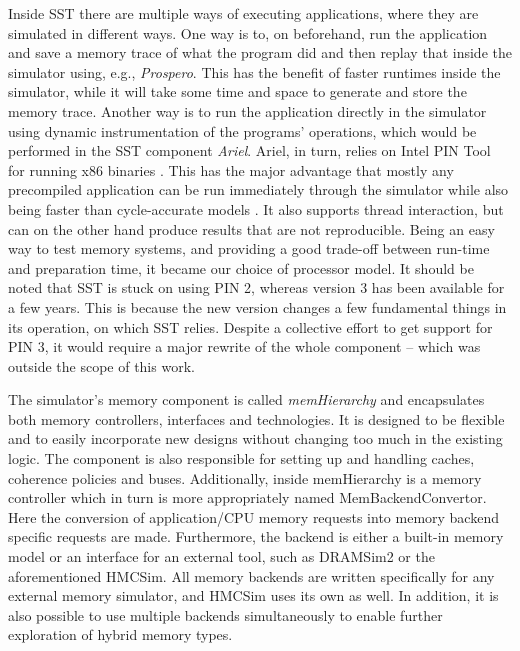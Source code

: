 Inside SST there are multiple ways of executing applications, where they are simulated in different ways. One way is to, on beforehand, run the application and save a memory trace of what the program did and then replay that inside the simulator using, e.g., \emph{Prospero}. This has the benefit of faster runtimes inside the simulator, while it will take some time and space to generate and store the memory trace. Another way is to run the application directly in the simulator using dynamic instrumentation of the programs' operations, which would be performed in the SST component \emph{Ariel}. Ariel, in turn, relies on Intel PIN Tool for running x86 binaries \cite{Luk:2005:PBC:1065010.1065034}. This has the major advantage that mostly any precompiled application can be run immediately through the simulator while also being faster than cycle-accurate models \cite{hammond2018structural}. It also supports thread interaction, but can on the other hand produce results that are not reproducible. Being an easy way to test memory systems, and providing a good trade-off between run-time and preparation time, it became our choice of processor model. It should be noted that SST is stuck on using PIN 2, whereas version 3 has been available for a few years. This is because the new version changes a few fundamental things in its operation, on which SST relies. Despite a collective effort to get support for PIN 3, it would require a major rewrite of the whole component -- which was outside the scope of this work.
\bigskip

The simulator's memory component is called \emph{memHierarchy} and encapsulates both memory controllers, interfaces and technologies. It is designed to be flexible and to easily incorporate new designs without changing too much in the existing logic. The component is also responsible for setting up and handling caches, coherence policies and buses. Additionally, inside memHierarchy is a memory controller which in turn is more appropriately named MemBackendConvertor. Here the conversion of application/CPU memory requests into memory backend specific requests are made. Furthermore, the backend is either a built-in memory model or an interface for an external tool, such as DRAMSim2 or the aforementioned HMCSim. All memory backends are written specifically for any external memory simulator, and HMCSim uses its own as well. In addition, it is also possible to use multiple backends simultaneously to enable further exploration of hybrid memory types.
\bigskip

